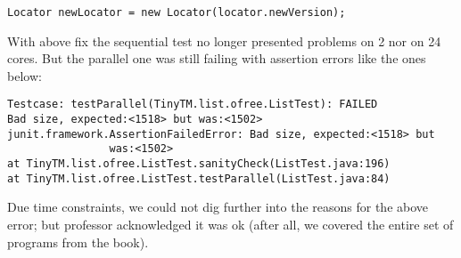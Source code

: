 \begin{lstlisting}[style=nonumbers]
Locator newLocator = new Locator(locator.newVersion);
\end{lstlisting}
\hfill

With above fix the sequential test  no longer presented problems on 2
nor on 24 cores. But the parallel one was still failing with assertion
errors like the ones below: \\

\begin{verbatim}
Testcase: testParallel(TinyTM.list.ofree.ListTest): FAILED
Bad size, expected:<1518> but was:<1502>
junit.framework.AssertionFailedError: Bad size, expected:<1518> but
                was:<1502>
at TinyTM.list.ofree.ListTest.sanityCheck(ListTest.java:196)
at TinyTM.list.ofree.ListTest.testParallel(ListTest.java:84)
\end{verbatim}
\hfill

Due time constraints, we could not dig further into the reasons for
the above error; but professor acknowledged it was ok (after all, we
covered the entire set of programs from the book).






